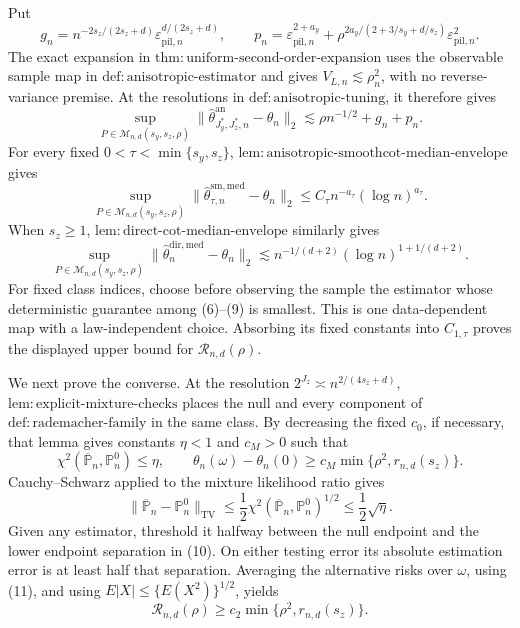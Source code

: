 Put
\[
g_n=n^{-2s_z/(2s_z+d)}
\varepsilon_{\mathrm{pil},n}^{d/(2s_z+d)},
\qquad
p_n=\varepsilon_{\mathrm{pil},n}^{2+a_y}
+\rho^{2a_y/(2+3/s_y+d/s_z)}\varepsilon_{\mathrm{pil},n}^2.
\]
The exact expansion in
\(\mathrm{thm{:}uniform\text{-}second\text{-}order\text{-}expansion}\)
uses the observable sample map in
\(\mathrm{def{:}anisotropic\text{-}estimator}\) and gives
\(V_{L,n}\lesssim\rho_n^2\), with no reverse-variance premise.  At the resolutions in
\(\mathrm{def{:}anisotropic\text{-}tuning}\), it therefore gives
\[
\sup_{P\in\mathcal M_{n,d}(s_y,s_z,\rho)}
\|\widehat\theta^{\mathrm{an}}_{J_y^*,J_z^*,n}-\theta_n\|_2
\lesssim \rho n^{-1/2}+g_n+p_n.                            \tag{7}
\]
For every fixed \(0<\tau<\min\{s_y,s_z\}\),
\(\mathrm{lem{:}anisotropic\text{-}smoothcot\text{-}median\text{-}envelope}\)
gives
\[
\sup_{P\in\mathcal M_{n,d}(s_y,s_z,\rho)}
\|\widehat\theta^{\mathrm{sm,med}}_{\tau,n}-\theta_n\|_2
\le C_\tau n^{-a_\tau}(\log n)^{a_\tau}.                  \tag{8}
\]
When \(s_z\ge1\),
\(\mathrm{lem{:}direct\text{-}cot\text{-}median\text{-}envelope}\)
similarly gives
\[
\sup_{P\in\mathcal M_{n,d}(s_y,s_z,\rho)}
\|\widehat\theta_n^{\mathrm{dir,med}}-\theta_n\|_2
\lesssim n^{-1/(d+2)}(\log n)^{1+1/(d+2)}.                 \tag{9}
\]
For fixed class indices, choose before observing the sample the estimator whose deterministic guarantee among (6)--(9) is smallest.  This is one data-dependent map with a law-independent choice.  Absorbing its fixed constants into \(C_{1,\tau}\) proves the displayed upper bound for \(\mathcal R_{n,d}(\rho)\).

We next prove the converse.  At the resolution
\(2^{J_z}\asymp n^{2/(4s_z+d)}\),
\(\mathrm{lem{:}explicit\text{-}mixture\text{-}checks}\) places the null and every component of
\(\mathrm{def{:}rademacher\text{-}family}\) in the same class.  By decreasing the fixed \(c_0\), if necessary, that lemma gives constants \(\eta<1\) and \(c_M>0\) such that
\[
\chi^2(\overline{\mathbb P}_n,\mathbb P_n^0)\le\eta,
\qquad
\theta_n(\omega)-\theta_n(0)
\ge c_M\min\{\rho^2,r_{n,d}(s_z)\}.                        \tag{10}
\]
Cauchy--Schwarz applied to the mixture likelihood ratio gives
\[
\|\overline{\mathbb P}_n-\mathbb P_n^0\|_{\mathrm{TV}}
\le\frac12\chi^2(\overline{\mathbb P}_n,\mathbb P_n^0)^{1/2}
\le\frac12\sqrt\eta.                                      \tag{11}
\]
Given any estimator, threshold it halfway between the null endpoint and the lower endpoint separation in (10).  On either testing error its absolute estimation error is at least half that separation.  Averaging the alternative risks over \(\omega\), using (11), and using
\(E|X|\le\{E(X^2)\}^{1/2}\), yields
\[
\mathcal R_{n,d}(\rho)
\ge c_2\min\{\rho^2,r_{n,d}(s_z)\}.                        \tag{12}
\]

